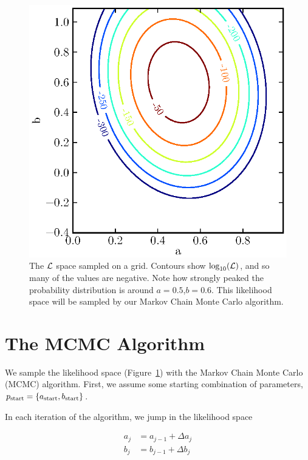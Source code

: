 \documentclass[iop,floatfix]{emulateapj}
\begin{document}
\begin{figure}
\begin{center}
  \includegraphics{likelihood}
  \caption{The ${\cal L}$ space sampled on a grid. Contours show $\log_{10}({\cal L})$, and so many of the values are negative. Note how strongly peaked the probability distribution is around $a=0.5$,$b=0.6$. This likelihood space will be sampled by our Markov Chain Monte Carlo algorithm.}
\label{fig:likelihood}
\end{center}
\end{figure}

\section{The MCMC Algorithm}

We sample the likelihood space (Figure~\ref{fig:likelihood}) with the Markov Chain Monte Carlo (MCMC) algorithm. First, we assume some starting combination of parameters, $p_{\rm start} = \{a_{\rm start}, b_{\rm start}\}$.

In each iteration of the algorithm, we jump in the likelihood space 

\begin{eqnarray}
  a_j &= a_{j-1} + \Delta a_j \\
  b_j &= b_{j-1} + \Delta b_j
\end{eqnarray}
\end{document}
